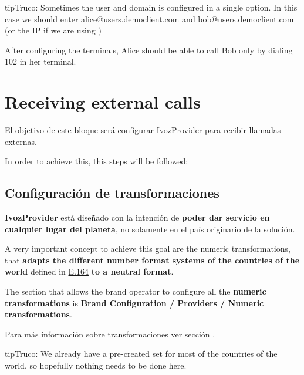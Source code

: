 \documentclass[letterpaper,10pt,spanish]{sphinxmanual}
\begin{document}
\begin{notice}{tip}{Truco:}
Sometimes the user and domain is configured in a single option. In this
case we should enter \href{mailto:alice@users.democlient.com}{alice@users.democlient.com} and \href{mailto:bob@users.democlient.com}{bob@users.democlient.com}
(or the IP if we are using {\hyperref[getting_started/internal_calls/brand_portal:dnshack]{}})
\end{notice}

After configuring the terminals, Alice should be able to call Bob only by
dialing 102 in her terminal.


\chapter{Receiving external calls}
\label{getting_started/external_incoming_calls/index::doc}\label{getting_started/external_incoming_calls/index:receiving-external-calls}
El objetivo de este bloque será configurar IvozProvider para recibir llamadas externas.

In order to achieve this, this steps will be followed:


\section{Configuración de transformaciones}
\label{getting_started/external_incoming_calls/transformations:transformations-configuration}\label{getting_started/external_incoming_calls/transformations::doc}
\textbf{IvozProvider} está diseñado con la intención de \textbf{poder dar servicio en cualquier lugar del planeta}, no solamente en el país originario de la solución.

A very important concept to achieve this goal are the numeric transformations,
that \textbf{adapts the different number format systems of the countries of the world}
defined in \href{https://www.itu.int/rec/T-REC-E.164/es}{E.164} \textbf{to a neutral
format}.

The section that allows the brand operator to configure all the \textbf{numeric
transformations} is \textbf{Brand Configuration / Providers / Numeric transformations}.

Para más información sobre transformaciones ver sección .

\begin{notice}{tip}{Truco:}
We already have a pre-created set for most of the countries of the world, so hopefully nothing needs to be done here.
\end{notice}
\end{document}

